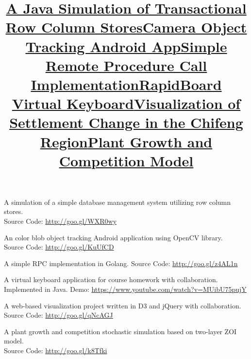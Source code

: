 \begin{resume}
\title{\textbf{\href{https://github.com/adorazhang/AndroidOpenCVTracking}{A Java Simulation of Transactional Row Column Stores}}}
\begin{position}
	A simulation of a simple database management system utilizing row column stores.\\
	Source Code: \url{http://goo.gl/WXR0wy}
\end{position}

\title{\textbf{\href{https://github.com/adorazhang/AndroidOpenCVTracking}{Camera Object Tracking Android App}}}
\begin{position}
An color blob object tracking Android application using OpenCV library. \\
Source Code: \url{http://goo.gl/KuUfCD}
\end{position}

\title{\textbf{\href{https://github.com/adorazhang/SimpleRPC}{Simple Remote Procedure Call Implementation}}}
\begin{position}
A simple RPC implementation in Golang. Source Code: \url{http://goo.gl/z4AL1n}
\end{position}

\title{\textbf{\href{https://www.youtube.com/watch?v=MUibU75pujY}{RapidBoard Virtual Keyboard}}}
\begin{position}
A virtual keyboard application for course homework with collaboration. Implemented in Java.
Demo: \url{https://www.youtube.com/watch?v=MUibU75pujY}
\end{position}



\title{\textbf{\href{https://github.com/adorazhang/CodeSnippets/tree/master/visualization-project}{Visualization of Settlement Change in the Chifeng Region}}}
\begin{position}
A web-based visualization project written in D3 and jQuery with collaboration. \\Source Code: \url{http://goo.gl/qNcAGJ}
\end{position}


\title{\textbf{\href{https://github.com/adorazhang/CodeSnippets/tree/master/growth-model}{Plant Growth and Competition Model}}}
\begin{position}
 A plant growth and competition stochastic simulation based on two-layer ZOI model. \\Source Code: \url{http://goo.gl/k8Tfki}
\end{position}


\end{resume}
